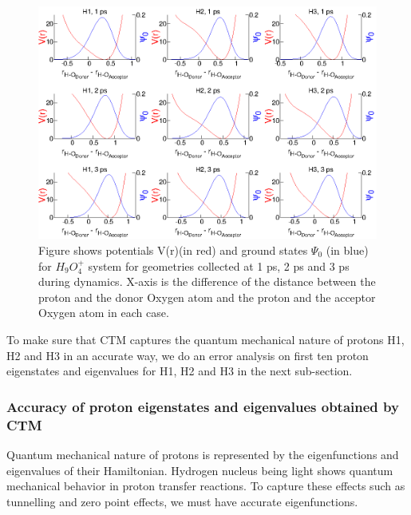 \begin{figure}[H]
  \begin{center}
    \includegraphics[width=1\textwidth]{figures/E.eps}
    \caption{\label{chap3fig5} Figure shows potentials V(r)(in red) and ground states \(\Psi_{0}\) (in blue) for
    $H_9O_4^+$ system for geometries collected at 1 ps, 2 ps and 3 ps during dynamics. X-axis is the difference
    of the distance between the proton and the donor Oxygen atom and the proton and the acceptor Oxygen atom
    in each case.}
  \end{center}
\end{figure}

To make sure that CTM captures the quantum mechanical nature of protons H1, H2 and H3 in an accurate way,
we do an error analysis on first ten proton eigenstates and eigenvalues for H1, H2 and H3 in the next sub-section.

\subsubsection{Accuracy of proton eigenstates and eigenvalues obtained by CTM}
Quantum mechanical nature of protons is represented by the eigenfunctions and eigenvalues of their Hamiltonian.
Hydrogen nucleus being light shows quantum mechanical behavior in proton transfer reactions. To capture these
effects such as tunnelling and zero point effects, we must have accurate eigenfunctions. 

